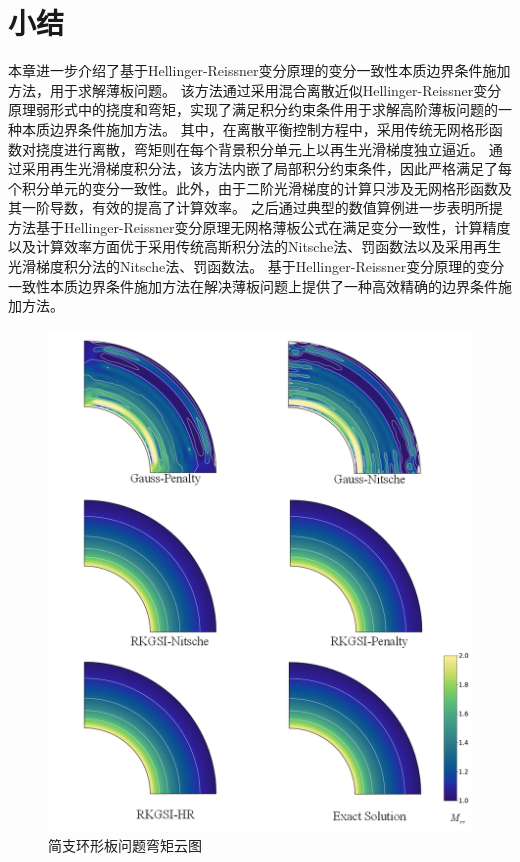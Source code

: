 \section{小结}
本章进一步介绍了基于Hellinger-Reissner变分原理的变分一致性本质边界条件施加方法，用于求解薄板问题。
该方法通过采用混合离散近似Hellinger-Reissner变分原理弱形式中的挠度和弯矩，实现了满足积分约束条件用于求解高阶薄板问题的一种本质边界条件施加方法。
其中，在离散平衡控制方程中，采用传统无网格形函数对挠度进行离散，弯矩则在每个背景积分单元上以再生光滑梯度独立逼近。
通过采用再生光滑梯度积分法，该方法内嵌了局部积分约束条件，因此严格满足了每个积分单元的变分一致性。此外，由于二阶光滑梯度的计算只涉及无网格形函数及其一阶导数，有效的提高了计算效率。 
之后通过典型的数值算例进一步表明所提方法基于Hellinger-Reissner变分原理无网格薄板公式在满足变分一致性，计算精度以及计算效率方面优于采用传统高斯积分法的Nitsche法、罚函数法以及采用再生光滑梯度积分法的Nitsche法、罚函数法。
基于Hellinger-Reissner变分原理的变分一致性本质边界条件施加方法在解决薄板问题上提供了一种高效精确的边界条件施加方法。
\newpage
\begin{figure}[H]
    \centering
    \includegraphics[scale=0.7]{figure/PHR/A/Mxy.png}
    \caption{简支环形板问题弯矩云图}\label{AMxy}
\end{figure}
